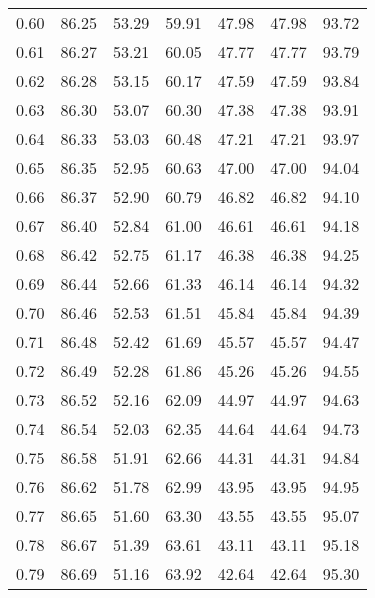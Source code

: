 \begin{tabular}{|c|c|c|c|c|c|c|}
      0.60 &     86.25 &     53.29 &      59.91 &   47.98 &      47.98 &         93.72 \\
      0.61 &     86.27 &     53.21 &      60.05 &   47.77 &      47.77 &         93.79 \\
      0.62 &     86.28 &     53.15 &      60.17 &   47.59 &      47.59 &         93.84 \\
      0.63 &     86.30 &     53.07 &      60.30 &   47.38 &      47.38 &         93.91 \\
      0.64 &     86.33 &     53.03 &      60.48 &   47.21 &      47.21 &         93.97 \\
      0.65 &     86.35 &     52.95 &      60.63 &   47.00 &      47.00 &         94.04 \\
      0.66 &     86.37 &     52.90 &      60.79 &   46.82 &      46.82 &         94.10 \\
      0.67 &     86.40 &     52.84 &      61.00 &   46.61 &      46.61 &         94.18 \\
      0.68 &     86.42 &     52.75 &      61.17 &   46.38 &      46.38 &         94.25 \\
      0.69 &     86.44 &     52.66 &      61.33 &   46.14 &      46.14 &         94.32 \\
      0.70 &     86.46 &     52.53 &      61.51 &   45.84 &      45.84 &         94.39 \\
      0.71 &     86.48 &     52.42 &      61.69 &   45.57 &      45.57 &         94.47 \\
      0.72 &     86.49 &     52.28 &      61.86 &   45.26 &      45.26 &         94.55 \\
      0.73 &     86.52 &     52.16 &      62.09 &   44.97 &      44.97 &         94.63 \\
      0.74 &     86.54 &     52.03 &      62.35 &   44.64 &      44.64 &         94.73 \\
      0.75 &     86.58 &     51.91 &      62.66 &   44.31 &      44.31 &         94.84 \\
      0.76 &     86.62 &     51.78 &      62.99 &   43.95 &      43.95 &         94.95 \\
      0.77 &     86.65 &     51.60 &      63.30 &   43.55 &      43.55 &         95.07 \\
      0.78 &     86.67 &     51.39 &      63.61 &   43.11 &      43.11 &         95.18 \\
      0.79 &     86.69 &     51.16 &      63.92 &   42.64 &      42.64 &         95.30 \\

\end{tabular}
